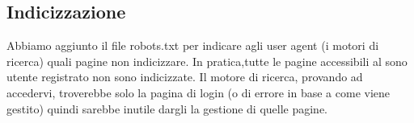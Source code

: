 \documentclass[1_relazione.tex]{subfiles}
\begin{document}
\subsection{Indicizzazione}
Abbiamo aggiunto il file robots.txt per indicare agli user agent (i motori di ricerca) quali pagine non indicizzare. In pratica,tutte le pagine accessibili al sono utente registrato non sono indicizzate. Il motore di ricerca, provando ad accedervi, troverebbe solo la pagina di login (o di errore in base a come viene gestito) quindi sarebbe inutile dargli la gestione di quelle pagine.
\end{document}
